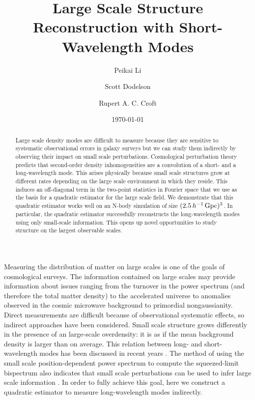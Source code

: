 \documentclass[prd,amsmath,amssymb,floatfix,superscriptaddress,nofootinbib,twocolumn]{revtex4-1}
\begin{document}
\title{Large Scale Structure Reconstruction with Short-Wavelength Modes}
\author{\large Peikai Li}
\author{\large Scott Dodelson}
\author{\large Rupert A. C. Croft}

\date{\today}
\begin{abstract}
\noindent Large scale density modes are difficult to measure because they are sensitive to systematic observational errors in galaxy surveys but we can study them indirectly by observing their impact on small scale perturbations. Cosmological perturbation theory predicts that second-order density inhomogeneities are a convolution of a short- and a long-wavelength mode. This arises physically because small scale structures grow at different rates depending on the large scale environment in which they reside. This induces an off-diagonal term in the two-point statistics in Fourier space that we use as the basis for a quadratic estimator for the large scale field. We demonstrate that this quadratic estimator works well on an N-body simulation of size  $(2.5\,h^{-1}\,\rm Gpc)^3$. In particular, the quadratic estimator successfully reconstructs the long-wavelength modes using only small-scale information. This opens up novel opportunities to study structure on the largest observable scales. 

\end{abstract}
\maketitle
{}
Measuring the distribution of matter on large scales is one of the goals of cosmological surveys. The information contained on large scales may provide information about issues ranging from the turnover in the power spectrum (and therefore the total matter density) to the accelerated universe to anomalies observed in the cosmic microwave background to primordial nongaussianity. Direct measurements are difficult because of observational systematic effects, so indirect approaches have been considered. Small scale structure grows differently in the presence of an large-scale overdensity: it is as if the mean background density is larger than on average. This relation between long- and short-wavelength modes has been discussed in recent years \cite{Baldauf:2011fer}\cite{Barreira:2017res}. The method of using the small scale position-dependent power spectrum to compute the squeezed-limit bispectrum also indicates that small scale perturbations can be used to infer large scale information \cite{Chiang:2014pos}\cite{Chiang:2015poss}. In order to fully achieve this goal, here we construct a quadratic estimator to measure long-wavelength modes indirectly. 
\end{document}
